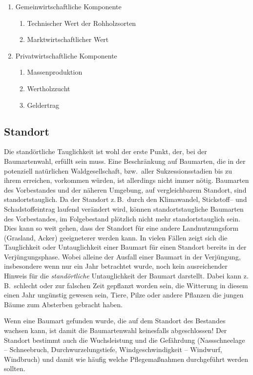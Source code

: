 \documentclass[twocolumn]{scrartcl}
\begin{document}
\begin{enumerate}
\begin{enumerate}
\begin{enumerate}
    \item Gemeinwirtschaftliche Komponente
      \begin{enumerate}
      \item Technischer Wert der Rohholzsorten
      \item Marktwirtschaftlicher Wert
      \end{enumerate}
    \item Privatwirtschaftliche Komponente
      \begin{enumerate}
      \item Massenproduktion
      \item Wertholzzucht
      \item Geldertrag
      \end{enumerate}
    \end{enumerate}
  \end{enumerate}
\end{enumerate}


\subsection{Standort}
\label{ssec:standort}

Die standörtliche Tauglichkeit ist wohl der erste Punkt, der, bei der
Baumartenwahl, erfüllt sein muss. Eine Beschränkung auf Baumarten, die in der
potenziell natürlichen Waldgesellschaft, bzw.\ aller Sukzessionsstadien bis zu
ihrem erreichen, vorkommen würden, ist allerdings nicht immer nötig. Baumarten
des Vorbestandes und der näheren Umgebung, auf vergleichbarem Standort, sind
standortstauglich. Da der Standort z.\,B.\ durch den Klimawandel, Stickstoff-- und
Schadstoffeintrag laufend verändert wird, können standortstaugliche Baumarten
des Vorbestandes, im Folgebestand plötzlich nicht mehr standortstauglich sein.
Dies kann so weit gehen, dass der Standort für eine andere Landnutzungsform
(Grasland, Acker) geeigneterer werden kann. In vielen Fällen zeigt sich die
Tauglichkeit oder Untauglichkeit einer Baumart für einen Standort bereits in der
Verjüngungsphase. Wobei alleine der Ausfall einer Baumart in der Verjüngung,
insbesondere wenn nur ein Jahr betrachtet wurde, noch kein ausreichender Hinweis
für die \emph{standörtliche} Untauglichkeit der Baumart darstellt. Dabei kann
z.\,B.\ schlecht oder zur falschen Zeit gepflanzt worden sein, die Witterung in
diesem einen Jahr ungünstig gewesen sein, Tiere, Pilze oder andere Pflanzen die
jungen Bäume zum Absterben gebracht haben.

Wenn eine Baumart gefunden wurde, die auf dem Standort des Bestandes
wachsen kann, ist damit die Baumartenwahl keinesfalls abgeschlossen!
Der Standort bestimmt auch die Wuchsleistung und die Gefährdung
(Nassschneelage -- Schneebruch, Durchwurzelungstiefe,
Windgeschwindigkeit -- Windwurf, Windbruch) und damit wie häufig
welche Pflegemaßnahmen durchgeführt werden sollten.
\end{document}
